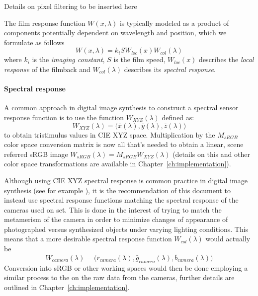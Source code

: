 \begin{inconstruction}
 Details on pixel filtering to be inserted here
\end{inconstruction}

The film response function $W(x, \lambda)$ is typically modeled as a product of
components potentially dependent on wavelength and position, which we formulate
as follows
\begin{equation}
W(x,\lambda) = k_i S W_{loc}(x) W_{col}(\lambda)
\end{equation}
where $k_i$ is the \textsl{imaging constant}, $S$ is the film speed,
$W_{loc}(x)$ describes the \textsl{local response} of the filmback and
$W_{col}(\lambda)$ describes its \textsl{spectral response}.

\paragraph{Spectral response}
A common approach in digital image synthesis to construct a spectral sensor
response function is to use the function $W_{XYZ}(\lambda)$ defined as:
\begin{equation}
W_{XYZ}(\lambda) = \big(\bar x(\lambda), \bar y (\lambda), \bar z(\lambda)\big)
\end{equation}
to obtain tristimulus values in \gls{CIE} \gls{XYZ} space.
Multiplication by the $M_{sRGB}$ color space conversion matrix is now all
that's needed to obtain a linear, scene referred \gls{sRGB} image
$W_{sRGB}(\lambda) = M_{sRGB} W_{XYZ}(\lambda)$
(details on this and other color space transformations are available in
Chapter~\ref{ch:implementation}).

Although using \gls{CIE} \gls{XYZ} spectral response is common practice
in digital image synthesis (see for example \cite{pharr2010, jakob2010,
ward1994}), it is the recommendation of this document to instead use spectral
response functions matching the spectral response of the cameras used on set.
This is done in the interest of trying to match the metamerism of the camera in
order to minimize changes of appearance of photographed versus synthesized
objects under varying lighting conditions. This means that a more desirable
spectral response function $W_{col}(\lambda)$ would actually be
\begin{equation}
W_{camera}(\lambda) = \big(\bar r_{camera}(\lambda), \bar g_{camera}(\lambda),
\bar b_{camera}(\lambda)\big)
\end{equation}
Conversion into \gls{sRGB} or other working spaces would then be done employing
a similar process to the on the raw data from the cameras, further details are
outlined in Chapter~\ref{ch:implementation}.


